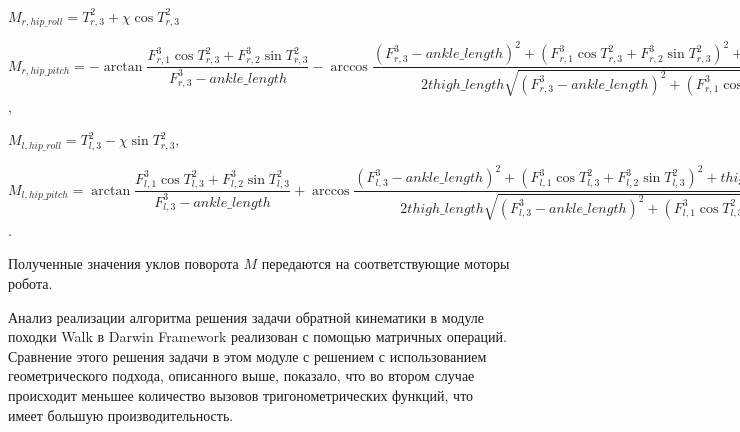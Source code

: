 \begin{center}
$M_{r,hip\_roll} = T^{2}_{r,3} + \chi \cos T^{2}_{r,3}$

$M_{r,hip\_pitch} = -\arctan \dfrac{  F^{3}_{r,1} \cos T^{2}_{r,3} + F^{3}_{r,2} \sin T^{2}_{r,3}  }{  F^{3}_{r,3} - ankle\_length  } - \arccos \dfrac{  (F^{3}_{r,3} - ankle\_length)^{2} + (F^{3}_{r,1} \cos T^{2}_{r,3} + F^{3}_{r,2} \sin T^{2}_{r,3}) ^ {2}  + thigh\_length^{2} - carf\_rength ^ 2 }{ 2 thigh\_length \sqrt{(F^{3}_{r,3} - ankle\_length)^{2} + (F^{3}_{r,1} \cos T^{2}_{r,3} + F^{3}_{r,2} \sin T^{2}_{r,3}) ^ {2}}} + \chi \sin T^{2}_{r,3}$,

$M_{l,hip\_roll} = T^{2}_{l,3} - \chi \sin T^{2}_{r,3}$,

$M_{l,hip\_pitch} = \arctan \dfrac{  F^{3}_{l,1} \cos T^{2}_{l,3} + F^{3}_{l,2} \sin T^{2}_{l,3}  }{  F^{3}_{l,3} - ankle\_length  } + \arccos \dfrac{  (F^{3}_{l,3} - ankle\_length)^{2} + (F^{3}_{l,1} \cos T^{2}_{l,3} + F^{3}_{l,2} \sin T^{2}_{l,3}) ^ {2}  + thigh\_length^{2} - calf\_length ^ 2 }{ 2 thigh\_length \sqrt{(F^{3}_{l,3} - ankle\_length)^{2} + (F^{3}_{l,1} \cos T^{2}_{l,3} + F^{3}_{l,2} \sin T^{2}_{l,3}) ^ {2}}} - \chi \sin T^{2}_{r,3}$.
\end{center}

Полученные значения уклов поворота $M$ передаются на соответствующие моторы робота.

Анализ реализации алгоритма решения задачи обратной кинематики в модуле походки Walk в Darwin Framework реализован с помощью матричных операций. Сравнение этого решения задачи в этом модуле с решением с использованием геометрического подхода, описанного выше, показало, что во втором случае происходит меньшее количество вызовов тригонометрических функций, что имеет большую производительность.







